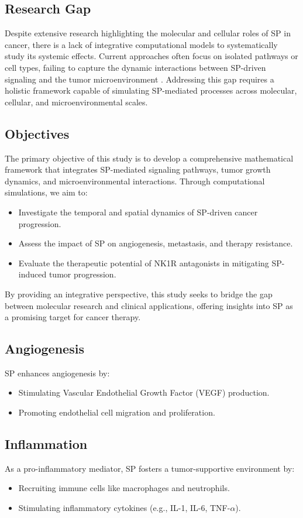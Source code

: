 \documentclass{article}
\theoremstyle{plain}
\theoremstyle{definition}
\begin{document}
\subsection{Research Gap}
Despite extensive research highlighting the molecular and cellular roles of SP in cancer, there is a lack of integrative computational models to systematically study its systemic effects. Current approaches often focus on isolated pathways or cell types, failing to capture the dynamic interactions between SP-driven signaling and the tumor microenvironment \cite{johnson2017biomodeling}. Addressing this gap requires a holistic framework capable of simulating SP-mediated processes across molecular, cellular, and microenvironmental scales.

\subsection{Objectives}
The primary objective of this study is to develop a comprehensive mathematical framework that integrates SP-mediated signaling pathways, tumor growth dynamics, and microenvironmental interactions. Through computational simulations, we aim to:
\begin{itemize}
    \item Investigate the temporal and spatial dynamics of SP-driven cancer progression.
    \item Assess the impact of SP on angiogenesis, metastasis, and therapy resistance.
    \item Evaluate the therapeutic potential of NK1R antagonists in mitigating SP-induced tumor progression.
\end{itemize}
By providing an integrative perspective, this study seeks to bridge the gap between molecular research and clinical applications, offering insights into SP as a promising target for cancer therapy.


\subsection{Angiogenesis}
SP enhances angiogenesis by:
\begin{itemize}
    \item Stimulating Vascular Endothelial Growth Factor (VEGF) production.
    \item Promoting endothelial cell migration and proliferation.
\end{itemize}

\subsection{Inflammation}
As a pro-inflammatory mediator, SP fosters a tumor-supportive environment by:
\begin{itemize}
    \item Recruiting immune cells like macrophages and neutrophils.
    \item Stimulating inflammatory cytokines (e.g., IL-1, IL-6, TNF-\(\alpha\)).
\end{itemize}
\end{document}
